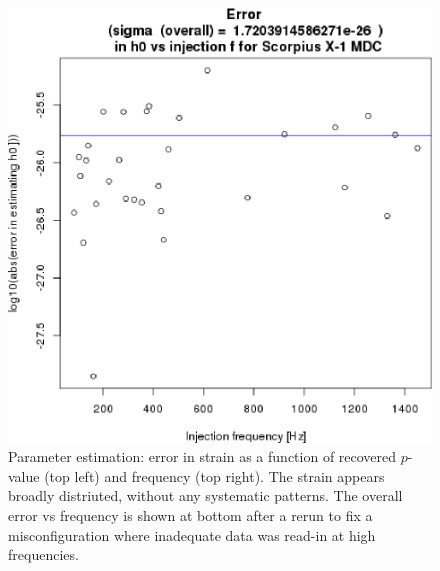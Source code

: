\begin{figure}
\begin{center}
\includegraphics[width=0.6\paperwidth,height=0.4\paperheight]{plots/Errorh0vsF-overall.eps}
\caption{Parameter estimation: error in strain as a function of recovered $p$-value (top left) and frequency (top right). The strain appears broadly distriuted, without any systematic patterns. The overall error vs frequency is shown at bottom after a rerun to fix a misconfiguration where inadequate data was read-in at high frequencies.
\label{fig:errorh0}}
\end{center}
\end{figure}


